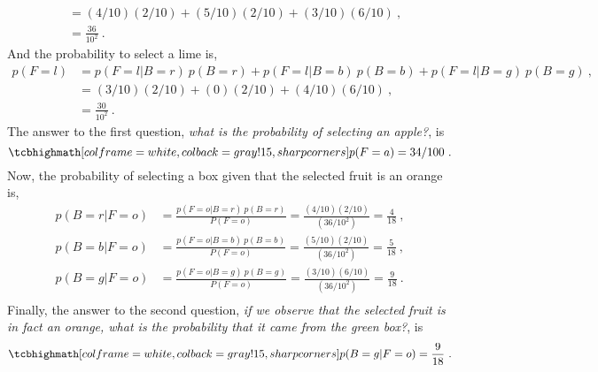 \begin{solution}
\begin{align*}
        & = (4/10)(2/10) + (5/10)(2/10) + (3/10)(6/10)\ ,\\
        & = \frac{36}{10^2}\ .
    \end{align*}
    And the probability to select a lime is,
    \begin{align*}
        p(F=l) & = p(F=l | B=r)\ p(B=r) + p(F=l | B=b)\ p(B=b) + p(F=l | B=g)\ p(B=g)\ ,\\
        & = (3/10)(2/10) + (0)(2/10) + (4/10)(6/10)\ ,\\
        & = \frac{30}{10^2}\ .
    \end{align*}
    The answer to the first question, \textit{what is the probability of selecting an apple?}, is 
    \begin{equation*}
        \result{
            p(F=a) = 34 / 100\ .
        }
    \end{equation*}
    Now, the probability of selecting a box given that the selected fruit is an orange is,
    \begin{align*}
        p(B=r | F=o) & = \frac{p(F=o | B=r)\ p(B=r)}{P(F=o)} = \frac{(4/10)(2/10)}{(36/10^2)} = \frac{4}{18}\ ,\\
        p(B=b | F=o) & = \frac{p(F=o | B=b)\ p(B=b)}{P(F=o)} = \frac{(5/10)(2/10)}{(36/10^2)} = \frac{5}{18}\ ,\\
        p(B=g | F=o) & = \frac{p(F=o | B=g)\ p(B=g)}{P(F=o)} = \frac{(3/10)(6/10)}{(36/10^2)} = \frac{9}{18}\ .\\
    \end{align*}
    Finally, the answer to the second question, \textit{if we observe that the selected fruit is in fact an orange, what is the probability that it came from the green box?}, is
    \begin{equation*}
        \result{
            p(B=g | F=o) = \frac{9}{18}\ .
        }
    \end{equation*}
\end{solution}

